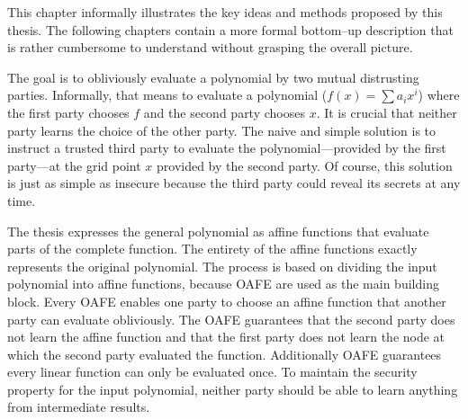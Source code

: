 \label{sec:methods}


%
%
\label{sec:illustration}

This chapter informally illustrates the key ideas and methods proposed by this
thesis. The following chapters contain a more formal bottom--up description that
is rather cumbersome to understand without grasping the overall picture.

The goal is to obliviously evaluate a polynomial by two mutual distrusting
parties. Informally, that means to evaluate a polynomial ($f(x) = \sum a_ix^i$)
where the first party chooses $f$ and the second party chooses $x$. It is
crucial that neither party learns the choice of the other party. The naive and
simple solution is to instruct a trusted third party to evaluate the
polynomial---provided by the first party---at the grid point $x$ provided by the
second party. Of course, this solution is just as simple as insecure because the
third party could reveal its secrets at any time.

The thesis expresses the general polynomial as affine functions that evaluate
parts of the complete function. The entirety of the affine functions exactly
represents the original polynomial. The process is based on dividing the input
polynomial into affine functions, because  {OAFE} \cite{davidgoliath} are used as the main building block.
Every OAFE enables one party to choose an affine function that another party can
evaluate obliviously. The OAFE guarantees that the second party does not learn
the affine function and that the first party does not learn the node at which
the second party evaluated the function. Additionally OAFE guarantees every
linear function can only be evaluated once. To maintain the security property
for the input polynomial, neither party should be able to learn anything from
intermediate results.

